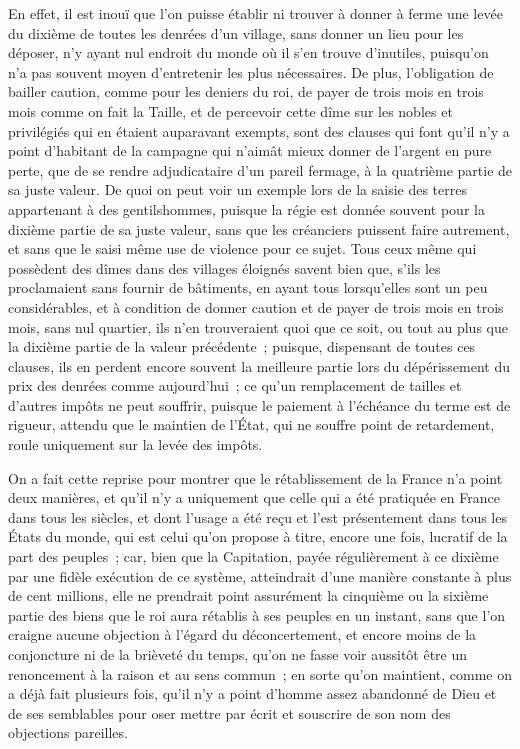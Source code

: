 \documentclass[french,twoside]{book} %
\begin{document}
En effet, il est inouï que l’on puisse établir ni trouver à donner à ferme une levée du dixième de toutes les denrées d’un village, sans donner un lieu pour les déposer, n’y ayant nul endroit du monde où il s’en trouve d’inutiles, puisqu’on n’a pas souvent moyen d’entretenir les plus nécessaires. De plus, l’obligation de bailler caution, comme pour les deniers du roi, de payer de trois mois en trois mois comme on fait la Taille, et de percevoir cette dîme sur les nobles et privilégiés qui en étaient auparavant exempts, sont des clauses qui font qu’il n’y a point d’habitant de la campagne qui n’aimât mieux donner de l’argent en pure perte, que de se rendre adjudicataire d’un pareil fermage, à la quatrième partie de sa juste valeur. De quoi on peut voir un exemple lors de la saisie des terres appartenant à des gentilshommes, puisque la régie est donnée souvent pour la dixième partie de sa juste valeur, sans que les créanciers puissent faire autrement, et sans que le saisi même use de violence pour ce sujet. Tous ceux même qui possèdent des dîmes dans des villages éloignés savent bien que, s’ils les proclamaient sans fournir de bâtiments, en ayant tous lorsqu’elles sont un peu considérables, et à condition de donner caution et de payer de trois mois en trois mois, sans nul quartier, ils n’en trouveraient quoi que ce soit, ou tout au plus que la dixième partie de la valeur précédente ; puisque, dispensant de toutes ces clauses, ils en perdent encore souvent la meilleure partie lors du dépérissement du prix des denrées comme aujourd’hui ; ce qu’un remplacement de tailles et d’autres impôts ne peut souffrir, puisque le paiement à l’échéance du terme est de rigueur, attendu que le maintien de l’État, qui ne souffre point de retardement, roule uniquement sur la levée des impôts.\par
On a fait cette reprise pour montrer que le rétablissement de la France n’a point deux manières, et qu’il n’y a uniquement que celle qui a été pratiquée en France dans tous les siècles, et dont l’usage a été reçu et l’est présentement dans tous les États du monde, qui est celui qu’on propose à titre, encore une fois, lucratif de la part des peuples ; car, bien que la Capitation, payée régulièrement à ce dixième par une fidèle exécution de ce système, atteindrait d’une manière constante à plus de cent millions, elle ne prendrait point assurément la cinquième ou la sixième partie des biens que le roi aura rétablis à ses peuples en un instant, sans que l’on craigne aucune objection à l’égard du déconcertement, et encore moins de la conjoncture ni de la brièveté du temps, qu’on ne fasse voir aussitôt être un renoncement à la raison et au sens commun ; en sorte qu’on maintient, comme on a déjà fait plusieurs fois, qu’il n’y a point d’homme assez abandonné de Dieu et de ses semblables pour oser mettre par écrit et souscrire de son nom des objections pareilles.\par
\end{document}
